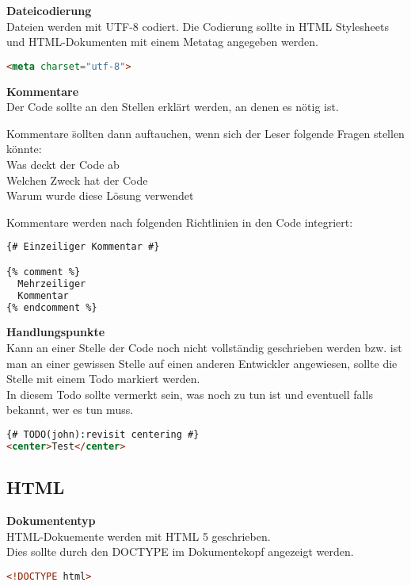 \textbf{Dateicodierung}\\
Dateien werden mit UTF-8 codiert.
Die Codierung sollte in HTML Stylesheets und HTML-Dokumenten mit einem Metatag angegeben werden.\\
\begin{lstlisting}[language = HTML, caption = Metatag für die UTF-8 Codierung, label = utf-8]
<meta charset="utf-8">
\end{lstlisting}

\textbf{Kommentare}\\
Der Code sollte an den Stellen erklärt werden, an denen es nötig ist.\\
\begin{tabbing}
Kommentare \= sollten dann auftauchen, wenn sich der Leser folgende Fragen stellen könnte:\\
\> Was deckt der Code ab\\
\> Welchen Zweck hat der Code\\
\> Warum wurde diese Lösung verwendet
\end{tabbing}
Kommentare werden nach folgenden Richtlinien in den Code integriert:
\begin{lstlisting}[language = HTML, caption = Kommentare, label = comments]
{# Einzeiliger Kommentar #}

{% comment %}
  Mehrzeiliger
  Kommentar
{% endcomment %}
\end{lstlisting}

\textbf{Handlungspunkte}\\
Kann an einer Stelle der Code noch nicht vollständig geschrieben werden bzw. ist man an einer gewissen Stelle auf einen anderen Entwickler angewiesen, sollte die Stelle mit einem Todo markiert werden.\\
In diesem Todo sollte vermerkt sein, was noch zu tun ist und eventuell falls bekannt, wer es tun muss.\\
\begin{lstlisting}[language = HTML, caption = Kennzeichnung eines Handlungspunktes, label = todo]
{# TODO(john):revisit centering #}
<center>Test</center>
\end{lstlisting}
\subsection{HTML}

\textbf{Dokumententyp}\\
HTML-Dokuemente werden mit HTML 5 geschrieben.\\
Dies sollte durch den DOCTYPE im Dokumentekopf angezeigt werden.
\begin{lstlisting}[language = HTML, caption = Kennzeichnung des Dokumententyps, label = doctype]
<!DOCTYPE html>
\end{lstlisting}

